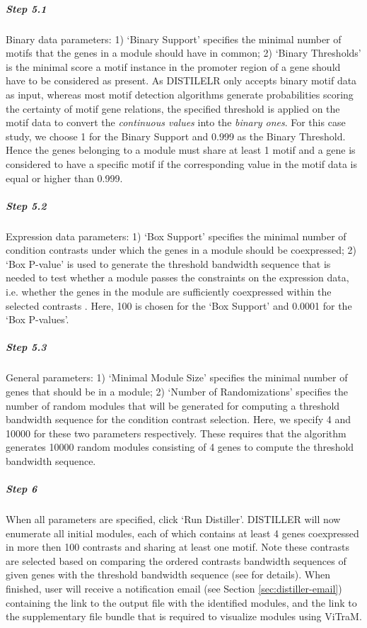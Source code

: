 \begin{small}
\subparagraph{Step 5.1} Binary data parameters: 1) `Binary Support' specifies 
the minimal number of motifs that the genes in a module should have in common;
2) `Binary Thresholds' is the minimal score a motif instance in the promoter
region of a gene should have to be considered as present.  
%
As DISTILELR only accepts binary motif data as input, whereas most motif
detection algorithms generate probabilities scoring the certainty of motif
gene relations, the specified threshold is applied on the motif data to
convert the \textit{continuous values} into the \textit{binary ones}.
%
For this case study, we choose 1 for the Binary Support and 
0.999 as the Binary Threshold. Hence the genes belonging to a module must share 
at least 1 motif and a gene is considered to have a specific motif if the 
corresponding value in the motif data is equal or higher than 0.999.

\subparagraph{Step 5.2}	Expression data parameters: 1) `Box Support' specifies 
the minimal number of condition contrasts under which the genes in a module
should be coexpressed; 2) `Box P-value' is used to generate the threshold
bandwidth sequence that is needed to test whether a module passes the
constraints on the expression data, i.e. whether the genes in the module are
sufficiently coexpressed within the selected contrasts \cite{Lemmens2009}.
Here, 100 is chosen for the `Box Support' and 0.0001 for the `Box P-values'.

\subparagraph{Step 5.3} General parameters: 1) `Minimal Module Size' specifies 
the minimal number of genes that should be in a module; 2) `Number of
Randomizations' specifies the number of random modules that will be generated
for computing a threshold bandwidth sequence for the condition contrast
selection.  Here, we specify 4 and 10000 for these two parameters
respectively.
These requires that the algorithm generates 10000 random modules consisting of
4 genes to compute the threshold bandwidth sequence.

\subparagraph{Step 6} When all parameters are specified, click `Run 
Distiller'. DISTILLER will now enumerate all initial modules, each of which
contains at least 4 genes coexpressed in more then 100 contrasts and sharing
at least one motif. Note these contrasts are selected based on comparing the
ordered contrasts bandwidth sequences of given genes with the threshold
bandwidth sequence (see \cite{Lemmens2009} for details).
%
When finished, user will receive a notification email (see Section 
\ref{sec:distiller-email}) containing the link to the output file with the
identified modules, and the link to the supplementary file bundle that is 
required to visualize modules using ViTraM.

\end{small} %


